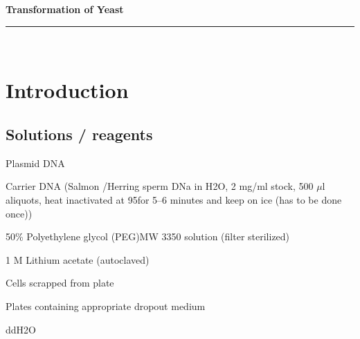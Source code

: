 \documentclass[a4paper,12pt]{article}
\newcommand{\protocol}{Transformation of Yeast}
\newcommand{\labtitle}{LAB TITLE}
\newcommand{\authorname}{YOURNAME}
\newenvironment{packed_enum}{
\begin{enumerate}
  \setlength{\itemsep}{1pt}
  \setlength{\parskip}{0pt}
  \setlength{\parsep}{0pt}
}{\end{enumerate}}
\begin{document}
 
 
 
\begin{titlepage}
\begin{center}
{\LARGE \textbf{\protocol} \\ \vspace{4pt}}
\rule[13pt]{\textwidth}{1pt} \\ \vspace{150pt}
\end{center}
 
\end{titlepage}
 
\newpage
\thispagestyle{empty}           %
\tableofcontents
\clearpage                      %
 
\setcounter{page}{1}
 
\section{Introduction}

	\subsection{Solutions / reagents}
			\begin{packed_enum}
				\item Plasmid DNA
				\item Carrier DNA (Salmon /Herring sperm DNa in H{\scriptsize2}O, 2 mg/ml stock, 500 $\mu$l aliquots, heat inactivated at 95\textcelsius for 5--6 minutes and keep on ice (has to be done once))
				\item 50\% Polyethylene glycol (PEG)MW 3350 solution (filter sterilized)
				\item 1 M Lithium acetate (autoclaved)
				\item Cells scrapped from plate
				\item Plates containing appropriate dropout medium
				\item ddH{\scriptsize2}O
					\end{packed_enum}
\end{document}
